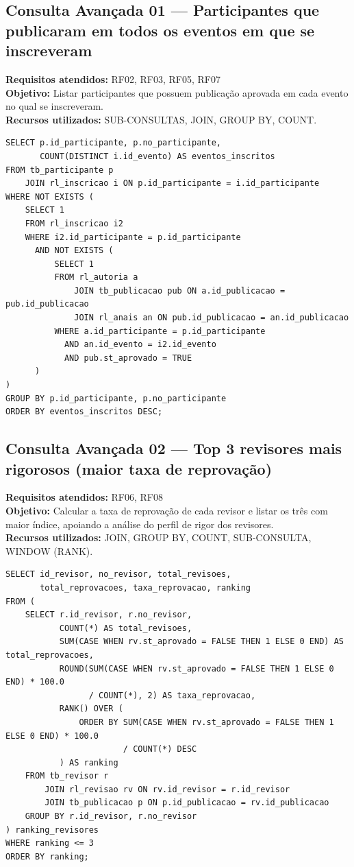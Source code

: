 \documentclass[12pt]{article}
\begin{document}
\subsection{Consulta Avançada 01 --- Participantes que publicaram em todos os eventos em que se inscreveram}
\textbf{Requisitos atendidos:} RF02, RF03, RF05, RF07 \\
\textbf{Objetivo:} Listar participantes que possuem publicação aprovada em cada evento no qual se inscreveram. \\
\textbf{Recursos utilizados:} SUB-CONSULTAS, JOIN, GROUP BY, COUNT.
\begin{lstlisting}[caption={QA01 --- Participantes que publicaram em todos os eventos em que se inscreveram.}]
SELECT p.id_participante, p.no_participante,
       COUNT(DISTINCT i.id_evento) AS eventos_inscritos
FROM tb_participante p
    JOIN rl_inscricao i ON p.id_participante = i.id_participante
WHERE NOT EXISTS (
    SELECT 1
    FROM rl_inscricao i2
    WHERE i2.id_participante = p.id_participante
      AND NOT EXISTS (
          SELECT 1
          FROM rl_autoria a
              JOIN tb_publicacao pub ON a.id_publicacao = pub.id_publicacao
              JOIN rl_anais an ON pub.id_publicacao = an.id_publicacao
          WHERE a.id_participante = p.id_participante
            AND an.id_evento = i2.id_evento
            AND pub.st_aprovado = TRUE
      )
)
GROUP BY p.id_participante, p.no_participante
ORDER BY eventos_inscritos DESC;
\end{lstlisting}

\subsection{Consulta Avançada 02 --- Top 3 revisores mais rigorosos (maior taxa de reprovação)}
\textbf{Requisitos atendidos:} RF06, RF08 \\
\textbf{Objetivo:} Calcular a taxa de reprovação de cada revisor e listar os três com maior índice, apoiando a análise do perfil de rigor dos revisores. \\
\textbf{Recursos utilizados:} JOIN, GROUP BY, COUNT, SUB-CONSULTA, WINDOW (RANK).
\begin{lstlisting}[caption={QA02 --- Top 3 revisores mais rigorosos.}]
SELECT id_revisor, no_revisor, total_revisoes,
       total_reprovacoes, taxa_reprovacao, ranking
FROM (
    SELECT r.id_revisor, r.no_revisor,
           COUNT(*) AS total_revisoes,
           SUM(CASE WHEN rv.st_aprovado = FALSE THEN 1 ELSE 0 END) AS total_reprovacoes,
           ROUND(SUM(CASE WHEN rv.st_aprovado = FALSE THEN 1 ELSE 0 END) * 100.0
                 / COUNT(*), 2) AS taxa_reprovacao,
           RANK() OVER (
               ORDER BY SUM(CASE WHEN rv.st_aprovado = FALSE THEN 1 ELSE 0 END) * 100.0
                        / COUNT(*) DESC
           ) AS ranking
    FROM tb_revisor r
        JOIN rl_revisao rv ON rv.id_revisor = r.id_revisor
        JOIN tb_publicacao p ON p.id_publicacao = rv.id_publicacao
    GROUP BY r.id_revisor, r.no_revisor
) ranking_revisores
WHERE ranking <= 3
ORDER BY ranking;
\end{lstlisting}
\end{document}
